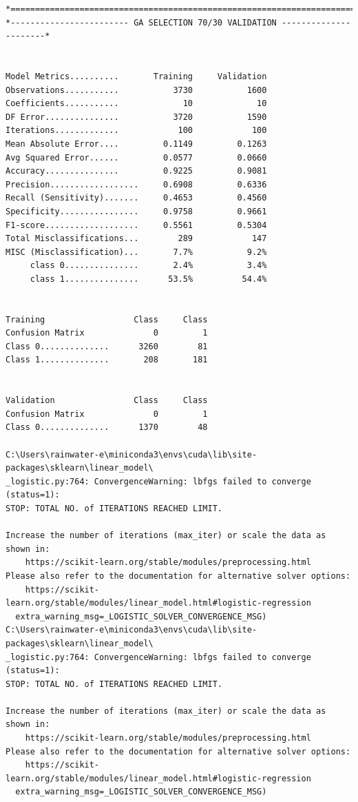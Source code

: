 \documentclass[12pt]{article}
\begin{document}
\begin{verbatim}
*=============================================================================*
*------------------------ GA SELECTION 70/30 VALIDATION ----------------------*


Model Metrics..........       Training     Validation
Observations...........           3730           1600
Coefficients...........             10             10
DF Error...............           3720           1590
Iterations.............            100            100
Mean Absolute Error....         0.1149         0.1263
Avg Squared Error......         0.0577         0.0660
Accuracy...............         0.9225         0.9081
Precision..................     0.6908         0.6336
Recall (Sensitivity).......     0.4653         0.4560
Specificity................     0.9758         0.9661
F1-score...................     0.5561         0.5304
Total Misclassifications...        289            147
MISC (Misclassification)...       7.7%           9.2%
     class 0...............       2.4%           3.4%
     class 1...............      53.5%          54.4%


Training                  Class     Class
Confusion Matrix              0         1
Class 0..............      3260        81
Class 1..............       208       181


Validation                Class     Class
Confusion Matrix              0         1
Class 0..............      1370        48

C:\Users\rainwater-e\miniconda3\envs\cuda\lib\site-packages\sklearn\linear_model\
_logistic.py:764: ConvergenceWarning: lbfgs failed to converge (status=1):
STOP: TOTAL NO. of ITERATIONS REACHED LIMIT.

Increase the number of iterations (max_iter) or scale the data as shown in:
    https://scikit-learn.org/stable/modules/preprocessing.html
Please also refer to the documentation for alternative solver options:
    https://scikit-learn.org/stable/modules/linear_model.html#logistic-regression
  extra_warning_msg=_LOGISTIC_SOLVER_CONVERGENCE_MSG)
C:\Users\rainwater-e\miniconda3\envs\cuda\lib\site-packages\sklearn\linear_model\
_logistic.py:764: ConvergenceWarning: lbfgs failed to converge (status=1):
STOP: TOTAL NO. of ITERATIONS REACHED LIMIT.

Increase the number of iterations (max_iter) or scale the data as shown in:
    https://scikit-learn.org/stable/modules/preprocessing.html
Please also refer to the documentation for alternative solver options:
    https://scikit-learn.org/stable/modules/linear_model.html#logistic-regression
  extra_warning_msg=_LOGISTIC_SOLVER_CONVERGENCE_MSG)


\end{verbatim}
\end{document}
